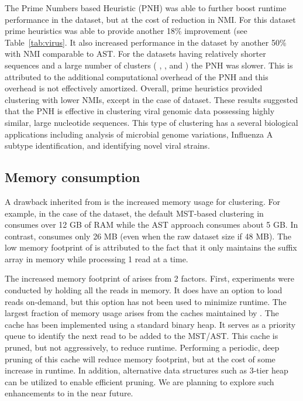 

The Prime Numbers based Heuristic (PNH) was able to further boost
runtime performance in the  dataset, but at the cost of
reduction in NMI.  For this dataset prime heuristics was able to
provide another 18\% improvement (see Table~\ref{tab:virus}.  It also
increased performance in the  dataset by another 50\% with
NMI comparable to AST.  For the datasets having relatively shorter
sequences and a large number of clusters (\ie\/ , , and
) the PNH was slower.  This is attributed to the additional
computational overhead of the PNH and this overhead is not effectively
amortized. Overall, prime heuristics provided clustering with lower
NMIs, except in the case of  dataset.  These results suggested
that the PNH is effective in clustering viral genomic data possessing
highly similar, large nucleotide sequences. This type of clustering
has a several biological applications including analysis of microbial
genome variations, Influenza A subtype identification, and identifying
novel viral strains.

\subsection{Memory consumption}

A drawback inherited from \peace\/ is the increased memory usage for
clustering.  For example, in the case of the  dataset, the
default MST-based clustering in \peace\/ consumes over 12 GB of RAM
while the AST approach consumes about 5 GB.  In contrast,
 consumes only 26 MB (even when the raw dataset size if
48 MB).  The low memory footprint of  is attributed to
the fact that it only maintains the suffix array in memory while
processing 1 read at a time.

The increased memory footprint of \peace\/ arises from 2 factors.
First, \peace\/ experiments were conducted by holding all the reads in
memory.  It does have an option to load reads on-demand, but this
option has not been used to minimize runtime.  The largest fraction of
memory usage arises from the caches maintained by \peace.  The cache
has been implemented using a standard binary heap.  It serves as a
priority queue to identify the next read to be added to the MST/AST.
This cache is pruned, but not aggressively, to reduce runtime.
Performing a periodic, deep pruning of this cache will reduce memory
footprint, but at the cost of some increase in runtime.  In addition,
alternative data structures such as 3-tier heap~\cite{higiro-17} can
be utilized to enable efficient pruning.  We are planning to explore
such enhancements to \peace\/ in the near future.
